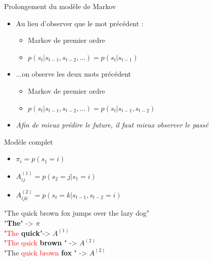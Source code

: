 \documentclass[aspectratio=169,xcolor=dvipsnames, t]{beamer}
\begin{document}
\begin{frame}{Prolongement du modèle de Markov}
	
	\begin{itemize}
		\item Au lieu d'observer que le mot précédent : 
		\begin{itemize}
			\item Markov de premier ordre
			\item $p(s_t |s_{t-1}, s_{t-2}, ...) = p(s_t | s_{t-1})$
		\end{itemize}
		\item ...on observe les deux mots précédent
		\begin{itemize}
			\item Markov de premier ordre
			\item $p(s_t |s_{t-1}, s_{t-2}, ...) = p(s_t | s_{t-1}, s_{t-2})$
		\end{itemize}
		\item \textit{Afin de mieux prédire le future, il faut mieux observer le passé}
	\end{itemize}

\end{frame}


\begin{frame}{Modèle complet}
	
	\begin{itemize}
		\item $ \pi_i = p(s_1 = i)$
		
		\item $ A^{(1)}_{ij} = p(s_2 = j | s_1 = i)$
		
		\item $ A^{(2)}_{ijk} = p(s_t = k | s_{t-1}, s_{t-2} = i)$
	\end{itemize}

\begin{example}
	"The quick brown fox jumps over the lazy dog" \\
	"\textbf{The}" -> $\pi$\\
	"\textcolor{red}{The} \textbf{quick}"-> $A^{(1)}$\\
	"\textcolor{red}{The quick} \textbf{brown} " -> $A^{(2)}$\\
	"The \textcolor{red}{quick brown} \textbf{fox} " -> $A^{(2)}$\\
\end{example}
	
\end{frame}
\end{document}
